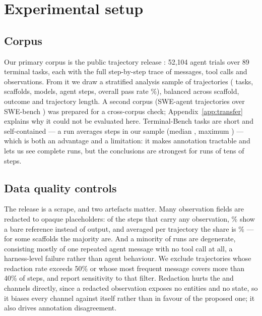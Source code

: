 \section{Experimental setup}
\label{sec:setup}

\subsection{Corpus}
Our primary corpus is the public \pcorpusName{} trajectory release \cite{yoonholee2026tb2}: 52{,}104 agent
trials over 89 terminal tasks, each with the full step-by-step trace of messages, tool calls and
observations. From it we draw a stratified analysis sample of \pnTraj{} trajectories (\pnTasks{} tasks,
\pcorpusScaffolds{} scaffolds, \pcorpusModels{} models, \pcorpusSteps{} agent steps, overall pass rate
\pcorpusPass{}\%), balanced across scaffold, outcome and trajectory length. A second corpus (SWE-agent
trajectories over SWE-bench \cite{nebius2024sweagenttraj}) was prepared for a cross-corpus check;
Appendix~\ref{app:transfer} explains why it could not be evaluated here. Terminal-Bench tasks are short and
self-contained --- a run averages \pcorpusStepsMean{} steps in our sample (median \pcorpusStepsMedian{},
maximum \pcorpusStepsMax{}) --- which is both an advantage and a limitation: it makes annotation tractable
and lets us see complete runs, but the conclusions are strongest for runs of tens of steps.

\subsection{Data quality controls}
The release is a scrape, and two artefacts matter. Many observation fields are redacted to opaque
placeholders: of the \pcorpusRedactSteps{} steps that carry any observation, \pcorpusRedactFrac{}\% show a
bare reference instead of output, and averaged per trajectory the share is \pcorpusRedactMean{}\% --- for
some scaffolds the majority are. And a minority of runs are degenerate, consisting mostly of one repeated
agent message with no tool call at all, a harness-level failure rather than agent behaviour. We exclude
trajectories whose redaction rate exceeds 50\% or whose most frequent message covers more than 40\% of
steps, and report sensitivity to that filter. Redaction hurts the \evid{} and \ver{} channels directly,
since a redacted observation exposes no entities and no state, so it biases every channel against itself
rather than in favour of the proposed one; it also drives annotation disagreement.

